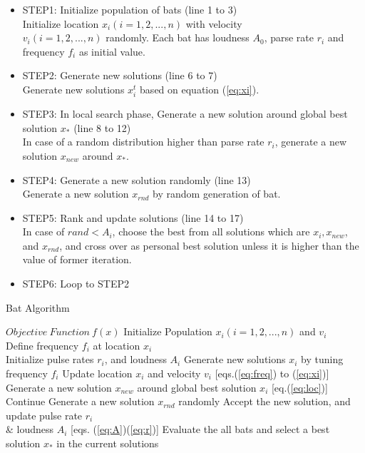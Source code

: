 \begin{itemize}
\item STEP1: Initialize population of bats (line 1 to 3)\\
Initialize location ${x_i}(i=1, 2, ..., n)$ with velocity\\ ${v_i}(i=1, 2, ..., n)$ randomly. Each bat has loudness ${A_0}$, parse rate ${r_i}$ and frequency ${f_i}$ as initial value.
\item STEP2: Generate new solutions (line 6 to 7)\\
Generate new solutions ${x_i^t}$ based on equation (\ref{eq:xi}).
\item STEP3: In local search phase, Generate a new solution around global best solution ${x_*}$ (line 8 to 12)\\
In case of a random distribution higher than parse rate ${r_i}$, generate a new solution ${x_{new}}$ around ${x_*}$.
\item STEP4: Generate a new solution randomly (line 13)\\
Generate a new solution ${x_{rnd}}$ by random generation of bat.  
\item STEP5: Rank and update solutions (line 14 to 17)\\
In case of ${rand < A_i}$, choose the best from all solutions which are ${x_i, x_{new}}$, and ${x_{rnd}}$, and cross over as personal best solution unless it is higher than the value of former iteration.  
\item STEP6: Loop to STEP2 
\end{itemize}

\begin{algorithm}[H]
\caption{Bat Algorithm}
\label{code:ba}
\begin{algorithmic}[1]
\REQUIRE $Objective\ Function\ f(x)$
\STATE Initialize Population $x_i(i=1,2,..., n)$ and $v_i$\\
\STATE Define frequency $f_i$ at location $x_i$ \\
\STATE Initialize pulse rates $r_i$, and loudness $A_i$
\STATE Generate new solutions $x_i$ by tuning frequency $f_i$
\STATE Update location $x_i$ and velocity $v_i$  [eqs.(\ref{eq:freq}) to (\ref{eq:xi})]
\STATE Generate a new solution $x_{new}$ around global best solution $x_i$ [eq.(\ref{eq:loc})] 
\ELSE
\STATE Continue
\ENDIF
\STATE Generate a new solution $x_{rnd}$ randomly
\STATE Accept the new solution, and update pulse rate $r_i$ \\ \& loudness $A_i$ [eqs. (\ref{eq:A})(\ref{eq:r})]  
\ENDIF
\STATE Evaluate the all bats and select a best solution $x_*$ in the current solutions
\ENDFOR
\ENDWHILE
\end{algorithmic}
\end{algorithm}

